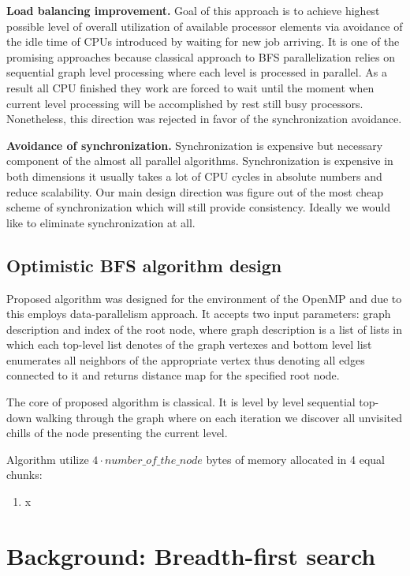 \documentclass[letterpaper]{article}
\begin{document}
			\textbf{Load balancing improvement.} 
			Goal of this approach is to achieve highest possible level of overall utilization of available processor elements via avoidance of the idle time of CPUs introduced by waiting for new job arriving.
			It is one of the promising approaches because classical approach to BFS parallelization relies on sequential graph level processing where each level is processed in parallel.
			As a result all CPU finished they work are forced to wait until the moment when current level processing will be accomplished by rest still busy processors.
			Nonetheless, this direction was rejected in favor of the synchronization avoidance. 
			
			\textbf{Avoidance of synchronization.}
			Synchronization is expensive but necessary component of the almost all parallel algorithms.
			Synchronization is expensive in both dimensions it usually takes a lot of CPU cycles in absolute numbers and reduce scalability.
			Our main design direction was figure out of the most cheap scheme of synchronization which will still provide consistency.
			Ideally we would like to eliminate synchronization at all.
			
		\subsection{Optimistic BFS algorithm design}
			Proposed algorithm was designed for the environment of the OpenMP and due to this employs data-parallelism approach. 
			It accepts two input parameters: graph description and index of the root node, where graph description is a list of lists in which each top-level list denotes of the graph vertexes and bottom level list enumerates all neighbors of the appropriate vertex thus denoting all edges connected to it and returns distance map for the specified root node.
			
			The core of proposed algorithm is classical. 
			It is level by level sequential top-down walking through the graph where on each iteration we discover all unvisited chills of the node presenting the current level.
			
			Algorithm utilize $4 \cdot number\_of\_the\_node$ bytes of memory allocated in 4 equal chunks:
			\begin{enumerate}
				\item x
			\end{enumerate}
			
	\section{Background: Breadth-first search}\label{sec:background}
	
\end{document}
